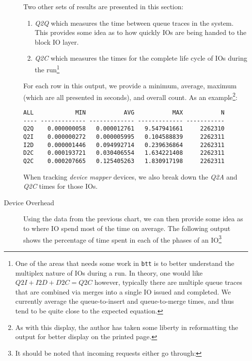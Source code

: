 \documentclass{article}
\begin{document}
\begin{description}
  Two other sets of results are presented in this section:

    \begin{enumerate}
      \item \emph{Q2Q} which measures the time between queue traces
      in the system. This provides some idea as to how quickly IOs are
      being handed to the block IO layer.

      \item \emph{Q2C} which measures the times for the complete life cycle
      of IOs during the run\footnote{One of the areas that needs some
      work in \texttt{btt} is to better understand the multiplex nature of
      IOs during a run. In theory, one would like ${Q2I} + {I2D} + {D2C}
      = {Q2C}$ however, typically there are multiple queue traces that
      are combined via merges into a single IO issued and completed. We
      currently average the queue-to-insert and queue-to-merge times,
      and thus tend to be quite close to the expected equation.}

    \end{enumerate}

  For each row in this output, we provide a minimum, average, maximum
  (which are all presented in seconds), and overall count. As an
  example\footnote{As with this display, the author has taken some liberty
  in reformatting the output for better display on the printed page.}:

\begin{verbatim}
ALL            MIN           AVG           MAX           N
---- ------------- ------------- ------------- -----------
Q2Q    0.000000058   0.000012761   9.547941661     2262310
Q2I    0.000000272   0.000005995   0.104588839     2262311
I2D    0.000001446   0.094992714   0.239636864     2262311
D2C    0.000193721   0.030406554   1.634221408     2262311
Q2C    0.000207665   0.125405263   1.830917198     2262311
\end{verbatim}

  When tracking \emph{device mapper} devices, we also break down the
  \emph{Q2A} and \emph{Q2C} times for those IOs.

  \item[Device Overhead]

  Using the data from the previous chart, we can then provide some idea
  as to where IO spend most of the time on average. The following output
  shows the percentage of time spent in each of the phases of an
IO\footnote{It should be noted that incoming requests either go through:

}
\end{description}
\end{document}
